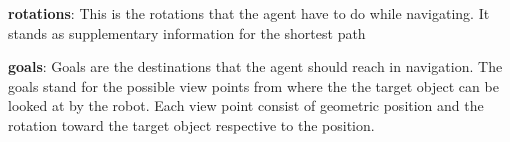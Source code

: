 \textbf{rotations}: This is the rotations that the agent have to do while navigating. It stands as supplementary information for the shortest path 

\textbf{goals}: Goals are the destinations that the agent should reach in navigation. The goals stand for the possible view points from where the the target object can be looked at by the robot. Each view point consist of geometric position and the rotation toward the target object respective to the position. 








